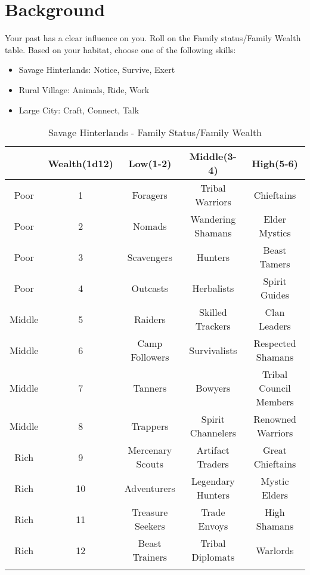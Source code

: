 \documentclass[itdr/core]{subfiles}
\begin{document}
\section{Background}
Your past has a clear influence on you. Roll on the Family status/Family Wealth table.
Based on your habitat, choose one of the following skills:

\begin{itemize}
\item Savage Hinterlands: Notice, Survive, Exert
\item Rural Village: Animals, Ride, Work
\item Large City: Craft, Connect, Talk
\end{itemize}

\begin{longtable}{ccccc}
\hline
& \textbf{Wealth(1d12)} & \textbf{Low(1-2)} & \textbf{Middle(3-4)} & \textbf{High(5-6)} \\
\hline
Poor & 1 & Foragers & Tribal Warriors & Chieftains \\
Poor & 2 & Nomads & Wandering Shamans & Elder Mystics \\
Poor & 3 & Scavengers & Hunters & Beast Tamers \\
Poor & 4 & Outcasts & Herbalists & Spirit Guides \\
Middle & 5 & Raiders & Skilled Trackers & Clan Leaders \\
Middle & 6 & Camp Followers & Survivalists & Respected Shamans \\
Middle & 7 & Tanners & Bowyers & Tribal Council Members \\
Middle & 8 & Trappers & Spirit Channelers & Renowned Warriors \\
Rich & 9 & Mercenary Scouts & Artifact Traders & Great Chieftains \\
Rich & 10 & Adventurers & Legendary Hunters & Mystic Elders \\
Rich & 11 & Treasure Seekers & Trade Envoys & High Shamans \\
Rich & 12 & Beast Trainers & Tribal Diplomats & Warlords \\
\hline
\caption{Savage Hinterlands - Family Status/Family Wealth}
\label{table:savage-hinterlands}
\end{longtable}
\end{document}
